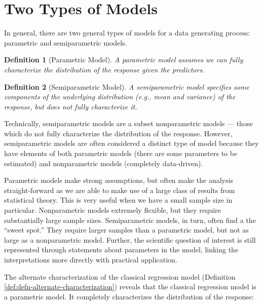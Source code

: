 \documentclass[
]{book}
\theoremstyle{plain}
\theoremstyle{mydefn}
\newtheorem{definition}{Definition}[chapter]
\theoremstyle{myexmpl}
\theoremstyle{remark}
\begin{document}
\hypertarget{two-types-of-models}{%
\section{Two Types of Models}\label{two-types-of-models}}

In general, there are two general types of models for a data generating process: parametric and semiparametric models.

\begin{definition}[Parametric Model]
\protect\hypertarget{def:defn-parametric-model}{}{\label{def:defn-parametric-model} {} }A parametric model assumes we can \emph{fully} characterize the distribution of the response given the predictors.
\end{definition}

\begin{definition}[Semiparametric Model]
\protect\hypertarget{def:defn-semiparametric-model}{}{\label{def:defn-semiparametric-model} {} }A semiparametric model specifies some components of the underlying distribution (e.g., mean and variance) of the response, but does not fully characterize it.
\end{definition}

\begin{rmdtip}
Technically, semiparametric models are a subset nonparametric models --- those which do not fully characterize the distribution of the response. However, semiparametric models are often considered a distinct type of model because they have elements of both parametric models (there are some parameters to be estimated) and nonparametric models (completely data-driven).
\end{rmdtip}

Parametric models make strong assumptions, but often make the analysis straight-forward as we are able to make use of a large class of results from statistical theory. This is very useful when we have a small sample size in particular. Nonparametric models extremely flexible, but they require substantially large sample sizes. Semiparametric models, in turn, often find a the ``sweet spot.'' They require larger samples than a parametric model, but not as large as a nonparametric model. Further, the scientific question of interest is still represented through statements about parameters in the model, linking the interpretations more directly with practical application.

The alternate characterization of the classical regression model (Definition \ref{def:defn-alternate-characterization}) reveals that the classical regression model is a parametric model. It completely characterizes the distribution of the response:
\end{document}
